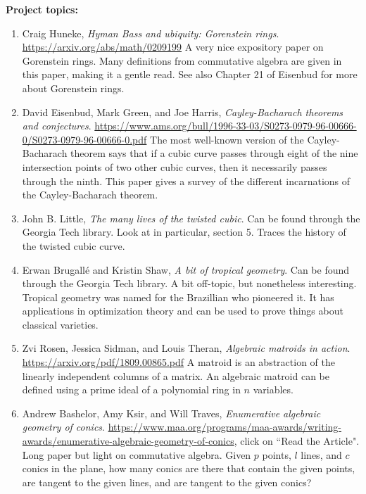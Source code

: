 \documentclass[12pt]%
{article}
\begin{document}
\newpage
\noindent\textbf{Project topics:}
\begin{enumerate}
\item Craig Huneke, \textit{Hyman Bass and ubiquity: Gorenstein rings}.  \url{https://arxiv.org/abs/math/0209199}  A very nice expository paper on Gorenstein rings.  Many definitions from commutative algebra are given in this paper, making it a gentle read.  See also Chapter 21 of Eisenbud for more about Gorenstein rings.
\item David Eisenbud, Mark Green, and Joe Harris, \textit{Cayley-Bacharach theorems and conjectures}.  \url{https://www.ams.org/bull/1996-33-03/S0273-0979-96-00666-0/S0273-0979-96-00666-0.pdf}  The most well-known version of the Cayley-Bacharach theorem says that if a cubic curve passes through eight of the nine intersection points of two other cubic curves, then it necessarily passes through the ninth.  This paper gives a survey of the different incarnations of the Cayley-Bacharach theorem.
\item John B. Little, \textit{The many lives of the twisted cubic}.  Can be found through the Georgia Tech library.  Look at in particular, section 5.  Traces the history of the twisted cubic curve.
\item Erwan Brugall\'e and Kristin Shaw, \textit{A bit of tropical geometry}.  Can be found through the Georgia Tech library.  A bit off-topic, but nonetheless interesting.  Tropical geometry was named for the Brazillian who pioneered it.  It has applications in optimization theory and can be used to prove things about classical varieties.
\item Zvi Rosen, Jessica Sidman, and Louis Theran, \textit{Algebraic matroids in action}.  \url{https://arxiv.org/pdf/1809.00865.pdf}  A matroid is an abstraction of the linearly independent columns of a matrix.  An algebraic matroid can be defined using a prime ideal of a polynomial ring in $n$ variables.
\item Andrew Bashelor, Amy Ksir, and Will Traves, \textit{Enumerative algebraic geometry of conics}.  \url{https://www.maa.org/programs/maa-awards/writing-awards/enumerative-algebraic-geometry-of-conics}, click on ``Read the Article".  Long paper but light on commutative algebra.  Given $p$ points, $l$ lines, and $c$ conics in the plane, how many conics are there that contain the given points, are tangent to the given lines, and are tangent to the given conics?

\end{enumerate}
\end{document}
